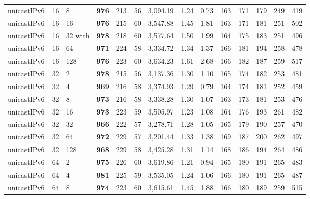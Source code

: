 \begin{table}[!htb]
\begin{tabular}{@{}llllllllllllll@{}}
		unicastIPv6 & 16           & 8     & \textbf{976}  & 213  & 56  & 3,094.19 & 1.24     & 0.73     & 163 & 171 & 179 & 249 & 419  \\
		unicastIPv6 & 16           & 16    & \textbf{976}  & 215  & 60  & 3,547.88 & 1.45     & 1.81     & 163 & 171 & 181 & 251 & 502  \\
		unicastIPv6 & 16           & 32 with    & \textbf{978}  & 218  & 60  & 3,577.64 & 1.50     & 1.99     & 164 & 175 & 183 & 251 & 496  \\
		unicastIPv6 & 16           & 64    & \textbf{971}  & 224  & 58  & 3,334.72 & 1.34     & 1.37     & 166 & 181 & 194 & 258 & 478  \\
		unicastIPv6 & 16           & 128   & \textbf{976}  & 223  & 60  & 3,634.23 & 1.61     & 2.68     & 166 & 182 & 187 & 259 & 517  \\ \hline
		unicastIPv6 & 32           & 2     & \textbf{978}  & 215  & 56  & 3,137.36 & 1.30     & 1.10     & 165 & 174 & 182 & 253 & 481  \\
		unicastIPv6 & 32           & 4     & \textbf{969}  & 216  & 58  & 3,374.93 & 1.29     & 0.79     & 164 & 174 & 181 & 252 & 459  \\
		unicastIPv6 & 32           & 8     & \textbf{973}  & 216  & 58  & 3,338.28 & 1.30     & 1.07     & 163 & 173 & 181 & 253 & 476  \\
		unicastIPv6 & 32           & 16    & \textbf{973}  & 223  & 59  & 3,505.97 & 1.23     & 1.08     & 164 & 176 & 193 & 261 & 482  \\
		unicastIPv6 & 32           & 32    & \textbf{966}  & 222  & 57  & 3,278.71 & 1.28     & 1.05     & 165 & 179 & 190 & 257 & 470  \\
		unicastIPv6 & 32           & 64    & \textbf{972}  & 229  & 57  & 3,201.44 & 1.33     & 1.38     & 169 & 187 & 200 & 262 & 497  \\
		unicastIPv6 & 32           & 128   & \textbf{968}  & 229  & 58  & 3,425.28 & 1.31     & 1.14     & 168 & 186 & 194 & 264 & 486  \\ \hline
		unicastIPv6 & 64           & 2     & \textbf{975}  & 226  & 60  & 3,619.86 & 1.21     & 0.94     & 165 & 180 & 191 & 265 & 483  \\
		unicastIPv6 & 64           & 4     & \textbf{981}  & 225  & 59  & 3,535.05 & 1.24     & 1.06     & 166 & 180 & 191 & 265 & 487  \\
		unicastIPv6 & 64           & 8     & \textbf{974}  & 223  & 60  & 3,615.61 & 1.45     & 1.88     & 166 & 180 & 189 & 259 & 515  \\

\end{tabular}
\end{table}
